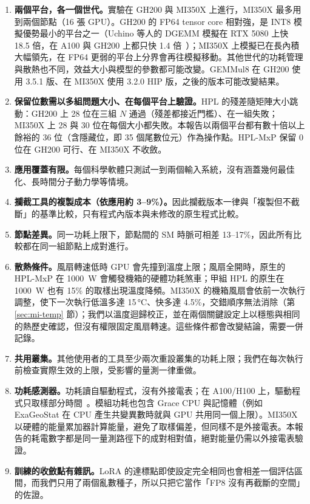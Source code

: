 \begin{enumerate}
  \item \textbf{兩個平台，各一個世代。}實驗在 GH200 與 MI350X 上進行，MI350X 最多用到兩個節點（16 張 GPU）。GH200 的 FP64 tensor core 相對強，是 INT8 模擬優勢最小的平台之一（Uchino 等人的 DGEMM 模擬在 RTX 5080 上快 18.5 倍，在 A100 與 GH200 上都只快 1.4 倍~\cite{Uchino2025}）；MI350X 上模擬已在長內積大幅領先，在 FP64 更弱的平台上分界會再往模擬移動。其他世代的功耗管理與散熱也不同，效益大小與模型的參數都可能改變。GEMMul8 在 GH200 使用 3.5.1 版、在 MI350X 使用 3.2.0 HIP 版，之後的版本可能改變結果。
  \item \textbf{保留位數需以多組問題大小、在每個平台上驗證。}HPL 的殘差隨矩陣大小跳動：GH200 上 28 位在三組 $N$ 通過（殘差都接近門檻）、在一組失敗；MI350X 上 28 與 30 位在每個大小都失敗。本報告以兩個平台都有數十倍以上餘裕的 36 位（含隱藏位，即 35 個尾數位元）作為操作點。HPL-MxP 保留 0 位在 GH200 可行、在 MI350X 不收斂。
  \item \textbf{應用覆蓋有限。}每個科學軟體只測試一到兩個輸入系統，沒有涵蓋幾何最佳化、長時間分子動力學等情境。
  \item \textbf{攔截工具的複製成本（依應用約 3–9\%）。}因此攔截版本一律與「複製但不截斷」的基準比較，只有程式內版本與未修改的原生程式比較。
  \item \textbf{節點差異。}同一功耗上限下，節點間的 SM 時脈可相差 13–17\%，因此所有比較都在同一組節點上成對進行。
  \item \textbf{散熱條件。}風扇轉速低時 GPU 會先撞到溫度上限；風扇全開時，原生的 HPL-MxP 在 1000~W 會觸發機箱的硬體功耗煞車；甲組 HPL 的原生在 1000~W 也有 15\% 的取樣出現溫度降頻。MI350X 的機箱風扇會依前一次執行調整，使下一次執行低溫多達 15\,°C、快多達 4.5\%，交錯順序無法消除（第 \ref{sec:mi-temp} 節）；我們以溫度迴歸校正，並在兩個關鍵設定上以穩態與相同的熱歷史確認，但沒有權限固定風扇轉速。這些條件都會改變結論，需要一併記錄。
  \item \textbf{共用叢集。}其他使用者的工具至少兩次重設叢集的功耗上限；我們在每次執行前檢查實際生效的上限，受影響的量測一律重做。
  \item \textbf{功耗感測器。}功耗讀自驅動程式，沒有外接電表；在 A100/H100 上，驅動程式只取樣部分時間~\cite{Yang2024}。模組功耗也包含 Grace CPU 與記憶體（例如 ExaGeoStat 在 CPU 產生共變異數時就與 GPU 共用同一個上限）。MI350X 以硬體的能量累加器計算能量，避免了取樣偏差，但同樣不是外接電表。本報告的耗電數字都是同一量測路徑下的成對相對值，絕對能量仍需以外接電表驗證。
  \item \textbf{訓練的收斂點有雜訊。}LoRA 的達標點即使設定完全相同也會相差一個評估區間，而我們只用了兩個亂數種子，所以只把它當作「FP8 沒有再截斷的空間」的佐證。

\end{enumerate}
